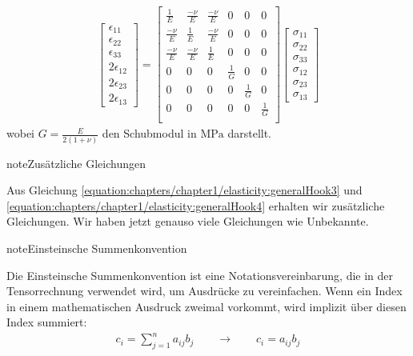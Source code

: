 \documentclass[letterpaper,10pt,german]{jupyterBook}
\begin{document}
\begin{equation}\label{equation:chapters/chapter1/elasticity:generalHook4}
\begin{split}\begin{bmatrix} 
\epsilon_{11} \\
\epsilon_{22} \\
\epsilon_{33} \\
2\epsilon_{12} \\
2\epsilon_{23} \\
2\epsilon_{13} 
\end{bmatrix} =\begin{bmatrix}
\frac{1}{E} & \frac{-\nu}{E} & \frac{-\nu}{E} & 0 & 0 & 0 \\
\frac{-\nu}{E} & \frac{1}{E} & \frac{-\nu}{E} & 0 & 0 & 0 \\
\frac{-\nu}{E} & \frac{-\nu}{E} & \frac{1}{E} & 0 & 0 & 0 \\
0 & 0 & 0 & \frac{1}{G} & 0 & 0 \\
0 & 0 & 0 & 0 & \frac{1}{G} & 0 \\
0 & 0 & 0 & 0 & 0 & \frac{1}{G} \\ 
\end{bmatrix} \begin{bmatrix} \sigma_{11} \\ \sigma_{22} \\ \sigma_{33} \\ \sigma_{12} \\ \sigma_{23} \\ \sigma_{13} \end{bmatrix}\end{split}
\end{equation}
\sphinxAtStartPar
wobei \(G=\frac{E}{2(1+\nu)}\) den Schubmodul in \(\text{MPa}\) darstellt.

\begin{sphinxadmonition}{note}{Zusätzliche Gleichungen}

\sphinxAtStartPar
Aus Gleichung \eqref{equation:chapters/chapter1/elasticity:generalHook3} und \eqref{equation:chapters/chapter1/elasticity:generalHook4} erhalten wir  zusätzliche Gleichungen. Wir haben jetzt genauso viele Gleichungen wie Unbekannte.
\end{sphinxadmonition}



\begin{sphinxadmonition}{note}{Einsteinsche Summenkonvention}

\sphinxAtStartPar
Die Einsteinsche Summenkonvention ist eine Notationsvereinbarung, die in der Tensorrechnung verwendet wird, um Ausdrücke zu vereinfachen. Wenn ein Index in einem mathematischen Ausdruck zweimal vorkommt, wird implizit über diesen Index summiert:
\begin{equation*}
\begin{split}
c_i = \sum_{j=1}^{n} a_{ij} b_j \qquad \rightarrow \qquad  c_i=a_{ij} b_j
\end{split}
\end{equation*}\end{sphinxadmonition}
\end{document}
